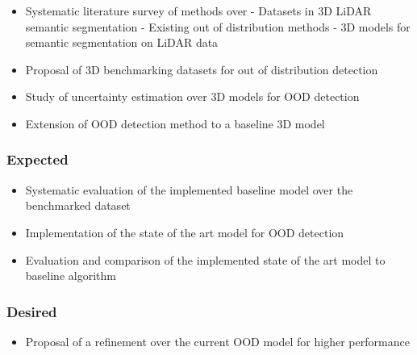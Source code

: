 \documentclass[thesis]{mas_proposal}
\begin{document}
\begin{itemize}
    \item Systematic literature survey of methods over
        \subitem- Datasets in 3D LiDAR semantic segmentation
        \subitem- Existing out of distribution methods 
        \subitem- 3D models for semantic segmentation on LiDAR data
    \item Proposal of 3D benchmarking datasets for out of distribution detection
    \item Study of uncertainty estimation over 3D models for OOD detection
    \item Extension of OOD detection method to a baseline 3D model
\end{itemize}

\subsubsection*{Expected}
\begin{itemize}
    \item Systematic evaluation of the implemented baseline model over the benchmarked dataset
    \item Implementation of the state of the art model for OOD detection
    \item Evaluation and comparison of the implemented state of the art model to baseline algorithm
\end{itemize}

\subsubsection*{Desired}
\begin{itemize}
    \item Proposal of a refinement over the current OOD model for higher performance
\end{itemize}


\nocite{*}

\end{document}
